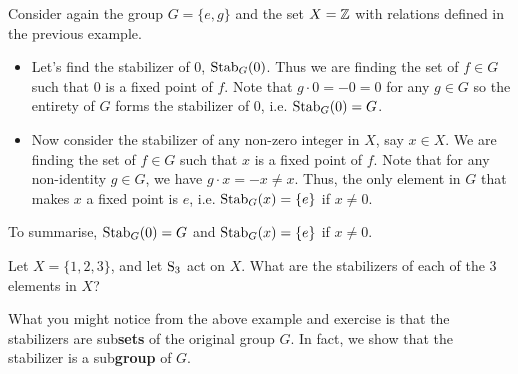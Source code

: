 \begin{example}
    Consider again the group $G = \{e, g\}$ and the set $X = \mathbb{Z}$ with relations defined in the previous example.
    \begin{itemize}
        \item Let's find the stabilizer of 0, $\mathrm{Stab}_{G}(0)$. Thus we are finding the set of $f \in G$ such that 0 is a fixed point of $f$. Note that $g \cdot 0 = -0 = 0$ for any $g \in G$ so the entirety of $G$ forms the stabilizer of 0, i.e. $\mathrm{Stab}_{G}(0) = G$.
        \item Now consider the stabilizer of any non-zero integer in $X$, say $x \in X$. We are finding the set of $f \in G$ such that $x$ is a fixed point of $f$. Note that for any non-identity $g \in G$, we have $g \cdot x = -x \neq x$. Thus, the only element in $G$ that makes $x$ a fixed point is $e$, i.e. $\mathrm{Stab}_{G}(x) = \{e\}$ if $x \neq 0$.
    \end{itemize}
    To summarise, $\mathrm{Stab}_{G}(0) = G$ and $\mathrm{Stab}_{G}(x) = \{e\}$ if $x \neq 0$.
\end{example}

\begin{exercise}
    Let $X = \{1, 2, 3\}$, and let $\mathrm{S}_{3}$ act on $X$. What are the stabilizers of each of the 3 elements in $X$?
\end{exercise}

What you might notice from the above example and exercise is that the stabilizers are sub\textbf{sets} of the original group $G$. In fact, we show that the stabilizer is a sub\textbf{group} of $G$.

